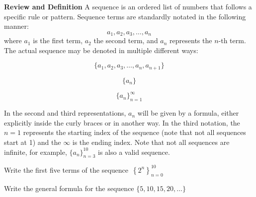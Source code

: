 \documentclass[addpoints]{exam}
\begin{document}
    \begin{tcolorbox}[breakable, title=SEQUENCES REVIEW, colframe=black, sharp corners, colback=white, colbacktitle=white, coltitle=black]
        \Large \textbf{Review and Definition}
        \newline\normalsize A sequence is an ordered list of numbers that follows a specific rule or pattern. Sequence terms are standardly notated in the following manner:
        \begin{equation*}
          a_1, a_2, a_3, \ldots, a_n
        \end{equation*}
        where $a_1$ is the first term, $a_2$ the second term, and $a_n$ represents the $n$-th term. The actual sequence may be denoted in multiple different ways: 
        \vspace{0.1in}
        \newline
        \begin{minipage}{0.3\linewidth}
          \[
            \{a_1, a_2, a_3, \ldots, a_n, a_{n+1}\}
          \]
        \end{minipage}
        \hfill
        \begin{minipage}{0.3\linewidth}
          \[
            \{a_n\}
          \]
        \end{minipage}
        \hfill
        \begin{minipage}{0.3\linewidth}
          \[
            \{a_n\}_{n=1}^{\infty}
          \]
        \end{minipage}
        \vspace{0.2in}
        \newline In the second and third representations, $a_n$ will be given by a formula, either explicitly inside the curly braces or in another way. In the third notation, the $n=1$ represents the starting index of the sequence (note that not all sequences start at 1) and the $\infty$ is the ending index. Note that not all sequences are infinite, for example, $\{a_n\}_{n=3}^{10}$ is also a valid sequence.

        \begin{questions}
          \begin{minipage}{0.45\linewidth}
            \question Write the first five terms of the sequence $\displaystyle\, \left\{2^n\right\}_{n=0}^{10}$
          \end{minipage}
          \hfill
          \begin{minipage}{0.45\linewidth}
            \question Write the general formula for the sequence $\{5, 10, 15, 20, \ldots \}$
          \end{minipage}
        \end{questions}
        \vspace{1in}
        \hrulefill 
        

\end{tcolorbox}
\end{document}

